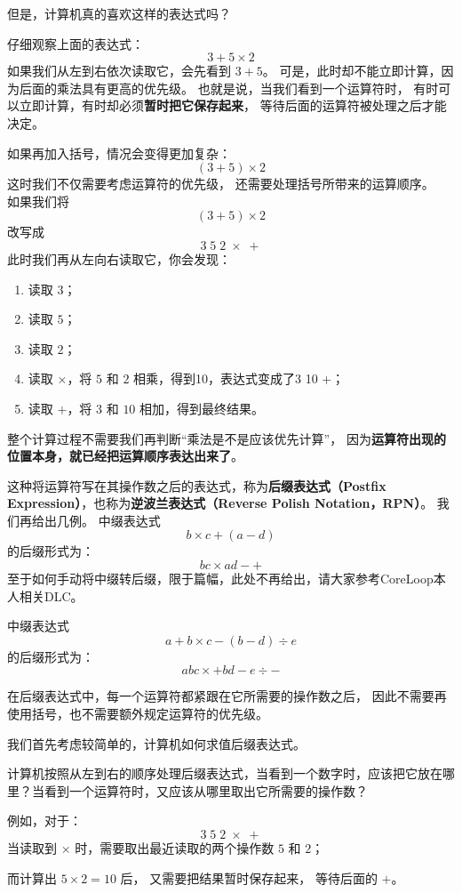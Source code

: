 但是，计算机真的喜欢这样的表达式吗？

仔细观察上面的表达式：
\[
3+5\times2
\]
如果我们从左到右依次读取它，会先看到 $3+5$。
可是，此时却不能立即计算，因为后面的乘法具有更高的优先级。
也就是说，当我们看到一个运算符时，
有时可以立即计算，有时却必须\textbf{暂时把它保存起来}，
等待后面的运算符被处理之后才能决定。

如果再加入括号，情况会变得更加复杂：
\[
(3+5)\times2
\]
这时我们不仅需要考虑运算符的优先级，
还需要处理括号所带来的运算顺序。\\

如果我们将
\[
(3+5)\times2
\]
改写成
\[
3\;5\;2\;\times \;+
\]
此时我们再从左向右读取它，你会发现：
\begin{enumerate}
    \item 读取 $3$；
    \item 读取 $5$；
    \item 读取 $2$；
    \item 读取 $\times$，将 $5$ 和 $2$ 相乘，得到10，表达式变成了3 10 +；
    \item 读取 $+$，将 $3$ 和 $10$ 相加，得到最终结果。
\end{enumerate}

整个计算过程不需要我们再判断“乘法是不是应该优先计算”，
因为\textbf{运算符出现的位置本身，就已经把运算顺序表达出来了}。

这种将运算符写在其操作数之后的表达式，称为\textbf{后缀表达式（Postfix Expression）}，也称为\textbf{逆波兰表达式（Reverse Polish Notation，RPN）}。
我们再给出几例。
中缀表达式
\[
b\times c+(a-d)
\]
的后缀形式为：
\[
bc\times ad-+
\]
至于如何手动将中缀转后缀，限于篇幅，此处不再给出，请大家参考CoreLoop本人相关DLC。

中缀表达式
\[
a+b\times c-(b-d)\div e
\]
的后缀形式为：
\[
abc\times +bd-e\div -
\]

在后缀表达式中，每一个运算符都紧跟在它所需要的操作数之后，
因此不需要再使用括号，也不需要额外规定运算符的优先级。

我们首先考虑较简单的，计算机如何求值后缀表达式。

计算机按照从左到右的顺序处理后缀表达式，当看到一个数字时，应该把它放在哪里？当看到一个运算符时，又应该从哪里取出它所需要的操作数？

例如，对于：
\[
3\;5\;2\;\times\;+
\]
当读取到 $\times$ 时，需要取出最近读取的两个操作数 $5$ 和 $2$；

而计算出 $5\times2=10$ 后，
又需要把结果暂时保存起来，
等待后面的 $+$。

